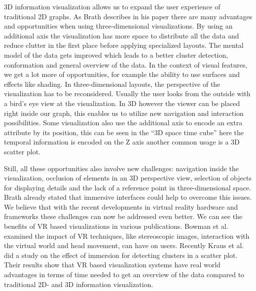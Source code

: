 3D information visualization allows us to expand the user experience of traditional 2D graphs. As Brath describes in his paper \cite{brath_3d_2014} there are many advantages and opportunities when using three-dimensional visualizations.
By using an additional axis the visualization has more space to distribute all the data and reduce clutter in the first place before applying specialized layouts. The mental model of the data gets improved which leads to a better cluster detection, conformation and general overview of the data.
In the context of visual features, we get a lot more of opportunities, for example the ability to use surfaces and effects like shading. 
In three-dimensional layouts, the perspective of the visualization has to be reconsidered. Usually the user looks from the outside with a bird's eye view at the visualization. In 3D however the viewer can be placed right inside our graph, this enables us to utilize new navigation and interaction possibilities. Some visualization also use the additional axis to encode an extra attribute by its position, this can be seen in the “3D space time cube” \cite{brath_3d_2014} here the temporal information is encoded on the Z axis another common usage is a 3D scatter plot. 

Still, all these opportunities also involve new challenges: navigation inside the visualization, occlusion of elements in an 3D perspective view, selection of objects for displaying details and the lack of a reference point in three-dimensional space. Brath \cite{brath_3d_2014} already stated that immersive interfaces could help to overcome this issues.
 We believe that with the recent developments in virtual reality hardware and frameworks these challenges can now be addressed even better. 
 We can see the benefits of VR based visualizations in various publications. Bowman et al. \cite{bowman_virtual_2007} examined the impact of VR techniques, like stereoscopic images, interaction with the virtual world and head movement, can have on users. 
 Recently Kraus et al. \cite{kraus_impact_2020} did a study on the effect of immersion for detecting clusters in a scatter plot. Their results show that VR based visualization systems have real world advantages in terms of time needed to get an overview of the data compared to traditional 2D- and 3D information visualization. 
 
